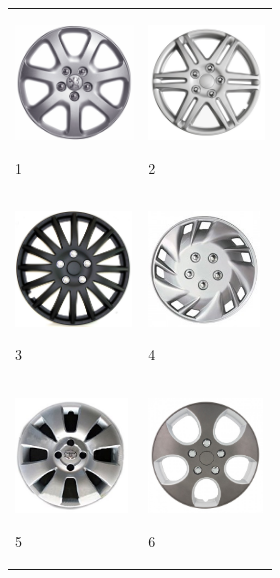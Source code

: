 \begin{mylist}
\begin{minipage}{0.4\textwidth}
	\begin{center}
		\centering
		\begin{tabular}{p{1in} p{1in}}
			\includegraphics[height=1.2in]{img-10/tapacubos1}\par 1 &
			\includegraphics[height=1.2in]{img-10/tapacubos2}\par 2 \\
			\includegraphics[height=1.2in]{img-10/tapacubos3}\par 3 &
			\includegraphics[height=1.2in]{img-10/tapacubos4}\par 4 \\
			\includegraphics[height=1.2in]{img-10/tapacubos5}\par 5 &
			\includegraphics[height=1.2in]{img-10/tapacubos6}\par 6 \\
		\end{tabular}
	\end{center}
\end{minipage}
\begin{minipage}{0.5\textwidth}
	

\end{minipage}
\end{mylist}
